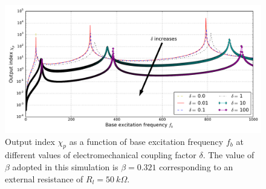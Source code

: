 \documentclass{article}
\begin{document}
\begin{figure}[!htbp]
    \centering
    \includegraphics[width=\textwidth]{./img_eig_asy/fig_sol_analytic_out_index_vs_fr}
    \caption{Output index $\chi_p$ as a function of base excitation frequency $f_b$ at different values of electromechanical coupling factor $\delta$. The value of $\beta$ adopted in this simulation is $\beta = 0.321$ corresponding to an external resistance of $R_l = 50\ k\Omega$. }
    \label{fig:fig_sol_analytic_out_index_vs_fr}
\end{figure}
\end{document}
